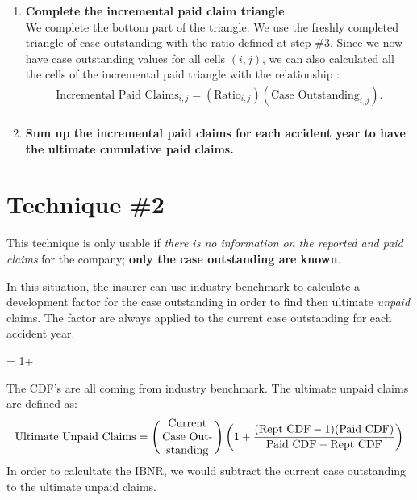 \documentclass[11pt, english]{memoir}
\numberwithin{definition}{section}
\begin{document}
\begin{enumerate}
		
		
		\item \textbf{Complete the incremental paid claim triangle}\\
		We complete the bottom part of the triangle. We use the freshly completed triangle of case outstanding with the ratio defined at step \#3. Since we now have case outstanding values for all cells $ (i,j) $, we can also calculated all the cells of the incremental paid triangle with the relationship : 
		\begin{align*}
		\text{Incremental Paid Claims}_{i,j} = \left(\text{Ratio}_{i,j}\right) \left(\text{Case Outstanding}_{i,j}\right).\\
		\end{align*}
		
		
		\item \textbf{Sum up the incremental paid claims for each accident year to have the ultimate cumulative paid claims.}\\
	\end{enumerate}



\section{Technique \#2}
This technique is only usable if \emph{there is no information on the reported and paid claims} for the company; \textbf{only the case outstanding are known}.

In this situation, the insurer can use industry benchmark to calculate a development factor for the case outstanding in order to find then ultimate \emph{unpaid} claims. The factor are always applied to the current case outstanding for each accident year. 
\begin{tcolorbox}
 = 1+  
\end{tcolorbox}
The CDF's are all coming from industry benchmark. The ultimate unpaid claims are defined as:
\begin{align*}
\text{Ultimate Unpaid Claims} = 
\left( \begin{minipage}{0.14\linewidth}\centering
Current Case Outstanding
\end{minipage}\right)
\left(1+ \frac{(\text{Rept CDF} - 1)(\text{Paid CDF})}{\text{Paid CDF} - \text{Rept CDF}}  \right)
\end{align*}	
In order to calcultate the IBNR, we would subtract the current case outstanding to the ultimate unpaid claims. 
\end{document}
